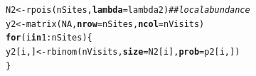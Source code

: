 \documentclass[color=usenames,dvipsnames]{beamer}\usepackage[]{graphicx}\usepackage[]{xcolor}
\makeatletter
\newcommand{\hlnum}[1]{\textcolor[rgb]{0.69,0.494,0}{#1}}%
\newcommand{\hlcom}[1]{\textcolor[rgb]{0.514,0.506,0.514}{\textit{#1}}}%
\newcommand{\hlopt}[1]{\textcolor[rgb]{0,0,0}{#1}}%
\newcommand{\hldef}[1]{\textcolor[rgb]{0,0,0}{#1}}%
\newcommand{\hlkwa}[1]{\textcolor[rgb]{0,0,0}{\textbf{#1}}}%
\newcommand{\hlkwb}[1]{\textcolor[rgb]{0,0.341,0.682}{#1}}%
\newcommand{\hlkwc}[1]{\textcolor[rgb]{0,0,0}{\textbf{#1}}}%
\newcommand{\hlkwd}[1]{\textcolor[rgb]{0.004,0.004,0.506}{#1}}%
\newenvironment{kframe}{%
 \def\at@end@of@kframe{}%
 \ifinner\ifhmode%
  \def\at@end@of@kframe{\end{minipage}}%
  \begin{minipage}{\columnwidth}%
 \fi\fi%
 \def\FrameCommand##1{\hskip\@totalleftmargin \hskip-\fboxsep
 \colorbox{shadecolor}{##1}\hskip-\fboxsep
     \hskip-\linewidth \hskip-\@totalleftmargin \hskip\columnwidth}%
 \MakeFramed {\advance\hsize-\width
   \@totalleftmargin\z@ \linewidth\hsize
   \@setminipage}}%
 {\par\unskip\endMakeFramed%
 \at@end@of@kframe}
\newenvironment{knitrout}{}{} %
\makeatother
\begin{document}
\begin{frame}[fragile]
\begin{knitrout}\scriptsize
{}\color{fgcolor}\begin{kframe}
\begin{alltt}
\hldef{N2} \hlkwb{<-} \hlkwd{rpois}\hldef{(nSites,} \hlkwc{lambda}\hldef{=lambda2)}         \hlcom{## local abundance }
\hldef{y2} \hlkwb{<-} \hlkwd{matrix}\hldef{(}\hlnum{NA}\hldef{,} \hlkwc{nrow}\hldef{=nSites,} \hlkwc{ncol}\hldef{=nVisits)}
\hlkwa{for}\hldef{(i} \hlkwa{in} \hlnum{1}\hlopt{:}\hldef{nSites) \{}
    \hldef{y2[i,]} \hlkwb{<-} \hlkwd{rbinom}\hldef{(nVisits,} \hlkwc{size}\hldef{=N2[i],} \hlkwc{prob}\hldef{=p2[i,])}
\hldef{\}}
\end{alltt}
\end{kframe}
\end{knitrout}
\end{frame}
\end{document}
